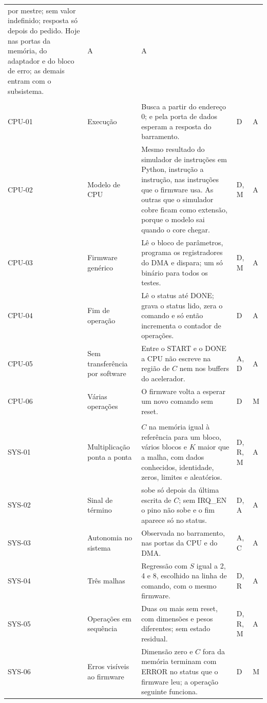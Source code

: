 \documentclass[10pt,a4paper]{article}
\newcommand{\code}[1]{\texttt{\detokenize{#1}}}
\begin{document}
{\begin{longtable}{@{}L{1.35cm}L{2.45cm}L{8.3cm}L{1.25cm}L{0.55cm}@{}}
por mestre; sem valor indefinido; resposta só depois do pedido. Hoje nas portas da memória, do
adaptador e do bloco de erro; as demais entram com o subsistema. & A & A\\
\\
CPU-01 & Execução & Busca a partir do endereço 0; \code{lw} e \code{sw} pela porta de dados
esperam a resposta do barramento. & D & A\\
CPU-02 & Modelo de CPU & Mesmo resultado do simulador de instruções em Python, instrução a
instrução, nas instruções que o firmware usa. As outras que o simulador cobre ficam como
extensão, porque o modelo sai quando o core chegar. & D, M & A\\
CPU-03 & Firmware genérico & Lê o bloco de parâmetros, programa os registradores do DMA e dispara;
um só binário para todos os testes. & D, M & A\\
CPU-04 & Fim de operação & Lê o status até DONE; grava o status lido, zera o comando e só então
incrementa o contador de operações. & D & A\\
CPU-05 & Sem transferência por software & Entre o START e o DONE a CPU não escreve na região de $C$
nem nos buffers do acelerador. & A, D & A\\
CPU-06 & Várias operações & O firmware volta a esperar um novo comando sem reset. & D & M\\
\\
SYS-01 & Multiplicação ponta a ponta & $C$ na memória igual à referência para um bloco, vários
blocos e $K$ maior que a malha, com dados conhecidos, identidade, zeros, limites e aleatórios. &
D, R, M & A\\
SYS-02 & Sinal de término & \code{irq_o} sobe só depois da última escrita de $C$; sem IRQ\_EN o
pino não sobe e o fim aparece só no status. & D, A & A\\
SYS-03 & Autonomia no sistema & Observada no barramento, nas portas da CPU e do DMA. & A, C & A\\
SYS-04 & Três malhas & Regressão com $S$ igual a 2, 4 e 8, escolhido na linha de comando, com o
mesmo firmware. & D, R & A\\
SYS-05 & Operações em sequência & Duas ou mais sem reset, com dimensões e pesos diferentes; sem
estado residual. & D, R, M & A\\
SYS-06 & Erros visíveis ao firmware & Dimensão zero e $C$ fora da memória terminam com ERROR no
status que o firmware leu; a operação seguinte funciona. & D & M\\

\end{longtable}}
\end{document}
